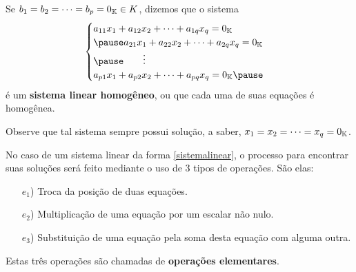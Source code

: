 \documentclass{beamer}
\begin{document}
    \begin{frame}
        Se $b_1 = b_2 = \cdots = b_p = 0_{\mathbb{K}} \in K$, \pause dizemos que o sistema\pause
        \begin{equation}\label{sistemalinearhomogeneo}\index{Sistema Linear}
            \begin{cases}
                a_{11}x_1 + a_{12}x_2 + \cdots + a_{1q}x_q = 0_\cp{K}\\\pause
                a_{21}x_1 + a_{22}x_2 + \cdots + a_{2q}x_q = 0_\cp{K}\\\pause
                \qquad \vdots\\
                a_{p1}x_1 + a_{p2}x_2 + \cdots + a_{pq}x_q = 0_\cp{K}\pause
            \end{cases}
        \end{equation}
        \'e um \textbf{sistema linear homog\^eneo}, \pause ou que cada uma de suas equa\c{c}\~oes \'e homog\^enea. \pause

        \vspace{.3cm}

        Observe que tal sistema sempre possui solu\c{c}\~ao, \pause a saber, $x_1 = x_2 = \cdots = x_q = 0_{\mathbb{K}}$.
    \end{frame}

    \begin{frame}
        No caso de um sistema linear da forma \eqref{sistemalinear}, \pause o processo para encontrar suas soluções ser\'a feito mediante o uso de 3 tipos de opera\c{c}\~oes. \pause S\~ao elas:\pause
        \begin{itemize}
	    \item[$e_1$)] Troca da posi\c{c}\~ao de duas equa\c{c}\~oes.\pause
	    \item[$e_2$)] Multiplica\c{c}\~ao de uma equa\c{c}\~ao por um escalar n\~ao nulo.\pause
	    \item[$e_3$)] Substitui\c{c}\~ao de uma equa\c{c}\~ao pela soma desta equa\c{c}\~ao com alguma outra.\pause
        \end{itemize}

        Estas tr\^es opera\c{c}\~oes s\~ao chamadas de \pause \textbf{opera\c{c}\~oes elementares}.
    \end{frame}
\end{document}
